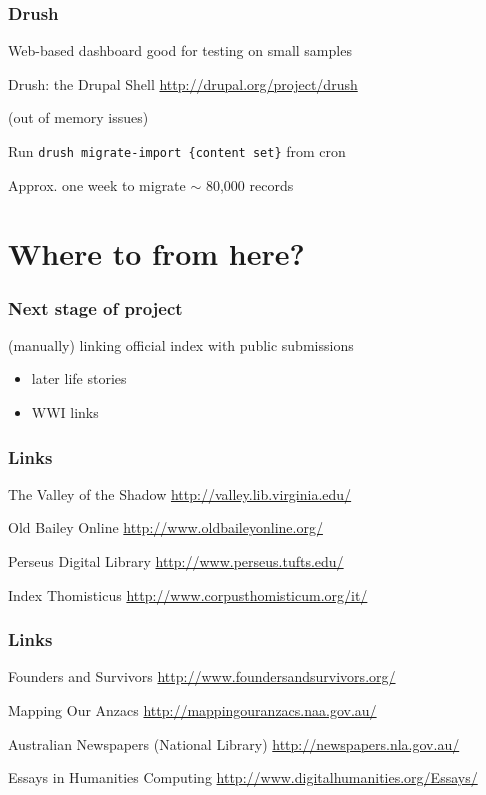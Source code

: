\documentclass[ignorenonframetext,11pt]{beamer}
\begin{document}
\begin{frame}
\frametitle{Drush}
\label{drush}

Web-based dashboard good for testing on small samples


Drush: the Drupal Shell \url{http://drupal.org/project/drush}


(out of memory issues)


Run \texttt{drush migrate-import \{content set\}} from cron


Approx. one week to migrate \ensuremath{\sim} 80,000 records



\end{frame}
		

\section{Where to from here?}
\label{wheretofromhere}

\begin{frame}
\frametitle{Next stage of project}
\label{nextstageofproject}

(manually) linking official index with public submissions


\begin{itemize}


\item later life stories

\item WWI links
\end{itemize}


\end{frame}
		

\begin{frame}
\frametitle{Links}
\label{links}

The Valley of the Shadow \url{http://valley.lib.virginia.edu/}


Old Bailey Online \url{http://www.oldbaileyonline.org/}


Perseus Digital Library \url{http://www.perseus.tufts.edu/}


Index Thomisticus \url{http://www.corpusthomisticum.org/it/}



\end{frame}
		

\begin{frame}
\frametitle{Links}
\label{links}

Founders and Survivors \url{http://www.foundersandsurvivors.org/}


Mapping Our Anzacs \url{http://mappingouranzacs.naa.gov.au/}


Australian Newspapers (National Library) \url{http://newspapers.nla.gov.au/}


Essays in Humanities Computing \url{http://www.digitalhumanities.org/Essays/}



\end{frame}
		
\end{document}
